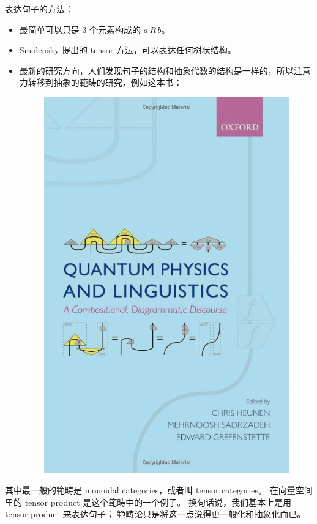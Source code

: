 \documentclass[12pt]{article}
\begin{document}
表达句子的方法：
\begin{itemize}
\item 最简单可以只是 3 个元素构成的 $a \, R \, b$。
\item Smolensky 提出的 tensor 方法，可以表达任何树状结构。
\item 最新的研究方向，人们发现句子的结构和抽象代数的结构是一样的，所以注意力转移到抽象的範畴的研究，例如这本书：
\begin{figure}[H]
\centering
\includegraphics[scale=0.3]{quantum-physics-and-linguistics-book-cover.png}
\end{figure}
\end{itemize}

其中最一般的範畴是 monoidal categories，或者叫 tensor categories。  在向量空间里的 tensor product 是这个範畴中的一个例子。  换句话说，我们基本上是用 tensor product 来表达句子； 範畴论只是将这一点说得更一般化和抽象化而已。
\end{document}
